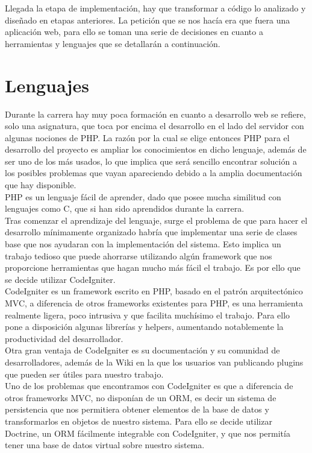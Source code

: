 Llegada la etapa de implementación, hay que transformar a código lo analizado y diseñado en etapas anteriores. La petición que se nos hacía era que fuera una aplicación web, para ello se toman una serie de decisiones en cuanto a herramientas y lenguajes que se detallarán a continuación.

\section{Lenguajes}

Durante la carrera hay muy poca formación en cuanto a desarrollo web se refiere, solo una asignatura, que toca por encima el desarrollo en el lado del servidor con algunas nociones de PHP. La razón por la cual se elige entonces PHP para el desarrollo del proyecto es ampliar los conocimientos en dicho lenguaje, además de ser uno de los más usados, lo que implica que será sencillo encontrar solución a los posibles problemas que vayan apareciendo debido a la amplia documentación que hay disponible.\\

PHP es un lenguaje fácil de aprender, dado que posee mucha similitud con lenguajes como C, que si han sido aprendidos durante la carrera.\\

Tras comenzar el aprendizaje del lenguaje, surge el problema de que para hacer el desarrollo mínimamente organizado habría que implementar una serie de clases base que nos ayudaran con la implementación del sistema. Esto implica un trabajo tedioso que puede ahorrarse utilizando algún framework que nos proporcione herramientas que hagan mucho más fácil el trabajo. Es por ello que se decide utilizar CodeIgniter.
\\

CodeIgniter es un framework escrito en PHP, basado en el patrón arquitectónico MVC, a diferencia de otros frameworks existentes para PHP, es una herramienta realmente ligera, poco intrusiva y que facilita muchísimo el trabajo. Para ello pone a disposición algunas librerías y helpers, aumentando notablemente la productividad del desarrollador. \\

Otra gran ventaja de CodeIgniter es su documentación y su comunidad de desarrolladores, además de la Wiki en la que los usuarios van publicando plugins que pueden ser útiles para nuestro trabajo.\\

Uno de los problemas que encontramos con CodeIgniter es que a diferencia de otros frameworks MVC, no disponían de un ORM, es decir un sistema de persistencia que nos permitiera obtener elementos de la base de datos y transformarlos en objetos de nuestro sistema. Para ello se decide utilizar Doctrine, un ORM fácilmente integrable con CodeIgniter, y que nos permitía tener una base de datos virtual sobre nuestro sistema.\\

